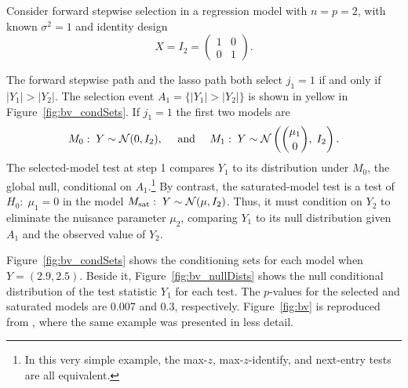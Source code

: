 \documentclass{article}
\begin{document}
\begin{example}\label{ex:bivariate}
  Consider forward stepwise selection in a regression model with $n=p=2$, with known $\sigma^2=1$ and identity design 
\[
X = I_2=\begin{pmatrix} 1 & 0 \\ 0 & 1\end{pmatrix}.
\] 

The forward stepwise path and the lasso path both select $j_1=1$ if and only if $|Y_1|>|Y_2|$. The selection event $A_1=\{|Y_1| > |Y_2|\}$ is shown in yellow in Figure~\ref{fig:bv_condSets}. If $j_1=1$ the first two models are
\[
M_0:\; Y\sim \mathcal{N}(0,I_2), \quad \text{ and } \quad
M_1:\; Y \sim \mathcal{N}\left(\binom{\mu_1}{0}, \; I_2\right).
\]
The selected-model test at step 1 compares $Y_1$ to its distribution under $M_0$, the global null, conditional on $A_1$.\footnote{In this very simple example, the max-$z$, max-$z$-identify, and next-entry tests are all equivalent.} By contrast, the saturated-model test is a test of $H_0:\; \mu_1=0$ in the model $M_{\text{sat}}:\; Y \sim \mathcal{N}(\mu, I_2)$. Thus, it must condition on $Y_2$ to eliminate the nuisance parameter $\mu_2$, comparing $Y_1$ to its null distribution given $A_1$ and the observed value of $Y_2$.

Figure~\ref{fig:bv_condSets} shows the conditioning sets for each model when $Y=(2.9, 2.5)$. Beside it, Figure~\ref{fig:bv_nullDists} shows the null conditional distribution of the test statistic $Y_1$ for each test. The $p$-values for the selected and saturated models are 0.007 and 0.3, respectively. Figure~\ref{fig:bv} is reproduced from \citet{fithian2014optimal}, where the same example was presented in less detail.
\end{example}
\end{document}
